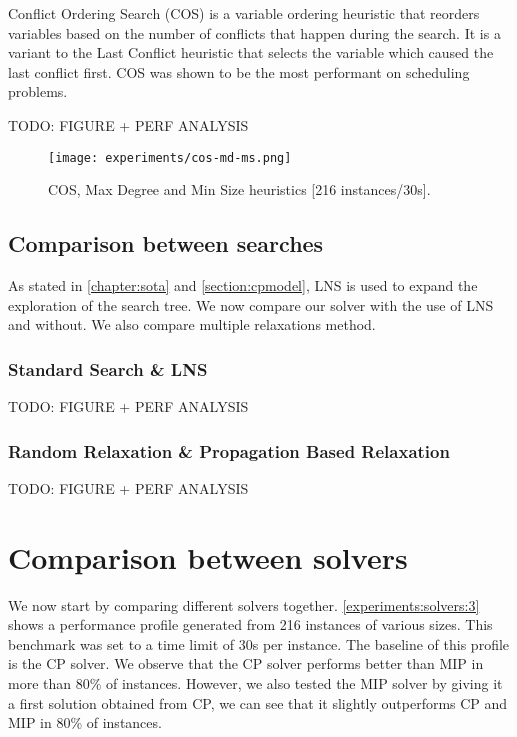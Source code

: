 \documentclass[../../thesis.tex]{subfiles}
\begin{document}
Conflict Ordering Search (COS) \cite{Gay:COS} is a variable ordering heuristic that 
reorders variables based on the number of conflicts that happen during the search.
It is a variant to the Last Conflict heuristic that selects the variable which caused the last conflict first.
COS was shown to be the most performant on scheduling problems.


TODO: FIGURE + PERF ANALYSIS

\begin{figure}
  \centering
  \texttt{[image: experiments/cos-md-ms.png]}
  \caption{COS, Max Degree and Min Size heuristics [216 instances/30s].}
  \label{experiments:heuristics:3}
\end{figure}


\subsection{Comparison between searches}


As stated in \autoref{chapter:sota} and \autoref{section:cpmodel}, LNS is used to expand the exploration
of the search tree. We now compare our solver with the use of LNS and without. We also compare multiple 
relaxations method.


\subsubsection{Standard Search \& LNS}

TODO: FIGURE + PERF ANALYSIS


\subsubsection{Random Relaxation \& Propagation Based Relaxation}

TODO: FIGURE + PERF ANALYSIS

\section{Comparison between solvers}

We now start by comparing different solvers together. \autoref{experiments:solvers:3} 
shows a performance profile generated from 216 instances of various sizes.
This benchmark was set to a time limit of 30s per instance. The baseline of this 
profile is the CP solver. We observe that the CP solver performs better than MIP in more than 80\% of instances.
However, we also tested the MIP solver by giving it a first solution obtained from CP, we can see that it slightly outperforms CP and MIP in 80\% of instances.
\end{document}
